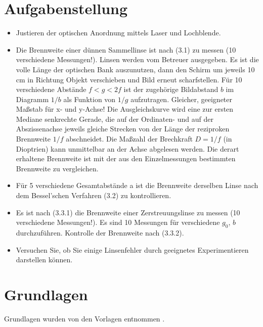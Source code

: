 \documentclass[11pt,ngerman]{scrartcl}
\begin{document}

\tableofcontents
\newpage

\section{Aufgabenstellung\label{Auf0}}

\begin{itemize}
	\item Justieren der optischen Anordnung mittels Laser und Lochblende.

	\item Die Brennweite einer dünnen Sammellinse ist nach (3.1) zu messen (10 verschiedene Messungen!).
	      Linsen werden vom Betreuer ausgegeben. Es ist die volle Länge der optischen Bank auszunutzen,
	      dann den Schirm um jeweils 10 cm in Richtung Objekt verschieben und Bild erneut
	      scharfstellen. Für 10 verschiedene Abstände $f < g < 2f$ ist der zugehörige Bildabstand
	      $b$ im Diagramm $1/b$ als Funktion von $1/g$ aufzutragen. Gleicher, geeigneter Maßstab für
	      x- und y-Achse! Die Ausgleichskurve wird eine zur ersten Mediane senkrechte Gerade, die
	      auf der Ordinaten- und auf der Abszissenachse jeweils gleiche Strecken von der Länge der
	      reziproken Brennweite $1/f$ abschneidet. Die Maßzahl der Brechkraft $D = 1/f$ (in Dioptrien)
	      kann unmittelbar an der Achse abgelesen werden. Die derart erhaltene Brennweite ist
	      mit der aus den Einzelmessungen bestimmten Brennweite zu vergleichen.

	\item Für 5 verschiedene Gesamtabstände a ist die Brennweite derselben Linse nach dem Bessel'schen
	      Verfahren (3.2) zu kontrollieren.

	\item Es ist nach (3.3.1) die Brennweite einer Zerstreuungslinse zu messen (10 verschiedene
	      Messungen!).
	      Es sind 10 Messungen für verschiedene $g_0$, $b$ durchzuführen. Kontrolle der Brennweite nach
	      (3.3.2).

	\item Versuchen Sie, ob Sie einige Linsenfehler durch geeignetes Experimentieren darstellen
	      können.

\end{itemize}

\newpage

\section{Grundlagen}
Grundlagen wurden von den Vorlagen entnommen \cite{linsenvorlage}.
\end{document}
